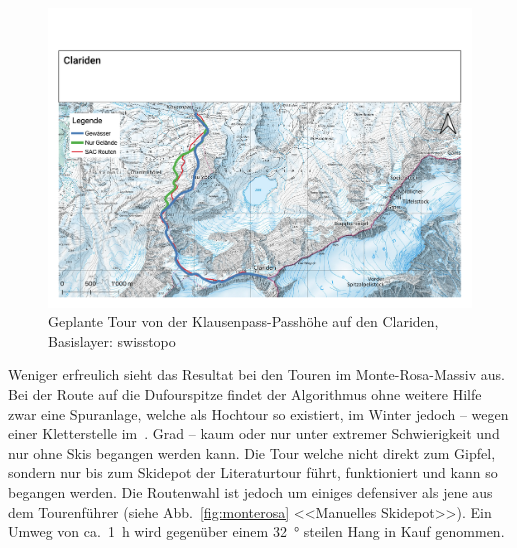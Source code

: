 \begin{figure}[ht]
  \centering
  \includegraphics[page=1,width=.9\linewidth]{./../evaluation/PDFs/Clariden.pdf}
  \caption{Geplante Tour von der Klausenpass-Passhöhe auf den Clariden, \\Basislayer: swisstopo}\label{fig:clariden}
\end{figure}


Weniger erfreulich sieht das Resultat bei den Touren im Monte-Rosa-Massiv aus. Bei der Route auf die Dufourspitze findet der Algorithmus ohne weitere Hilfe zwar eine Spuranlage, welche als Hochtour so existiert, im Winter jedoch -- wegen einer Kletterstelle im~. Grad -- kaum oder nur unter extremer Schwierigkeit und nur ohne Skis begangen werden kann. 
Die Tour welche nicht direkt zum Gipfel, sondern nur bis zum Skidepot der Literaturtour führt, funktioniert und kann so begangen werden. Die Routenwahl ist jedoch um einiges defensiver als jene aus dem Tourenführer (siehe Abb.\ \ref{fig:monterosa} <<Manuelles Skidepot>>). Ein Umweg von ca.\ \qty{1}{h} wird gegenüber einem \qty{32}{°} steilen Hang in Kauf genommen.

